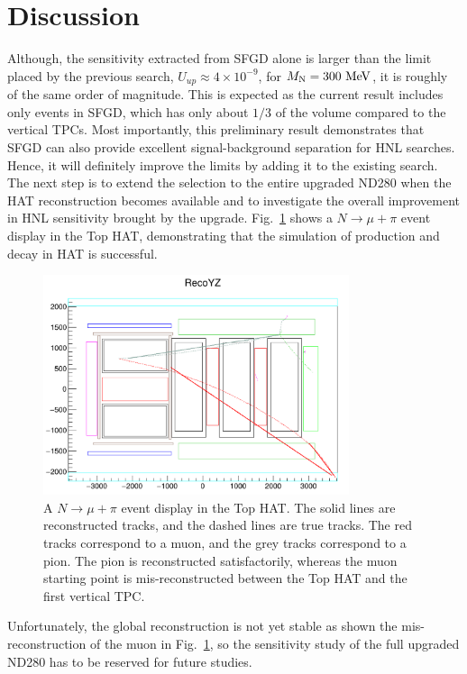     \section{Discussion}
        Although, the sensitivity extracted from SFGD alone is larger than the limit placed by the previous search, $U_{up}\approx4\times10^{-9}$, for $M_{\textrm{N}}=300~\textrm{MeV}$, it is roughly of the same order of magnitude. 
        This is expected as the current result includes only events in SFGD, which has only about $1/3$ of the volume compared to the vertical TPCs. 
        Most importantly, this preliminary result demonstrates that SFGD can also provide excellent signal-background separation for HNL searches.
        Hence, it will definitely improve the limits by adding it to the existing search. 
        The next step is to extend the selection to the entire upgraded ND280 when the HAT reconstruction becomes available and to investigate the overall improvement in HNL sensitivity brought by the upgrade.
        Fig.~\ref{fig:hnl-hatevedis} shows a $N\rightarrow\mu+\pi$ event display in the Top HAT, demonstrating that the simulation of production and decay in HAT is successful. 
        \begin{figure}[!htb] 
            \centering 		
            \includegraphics[width=0.8\textwidth]{figures/hnl/HATevedis.png}
            \caption{\label{fig:hnl-hatevedis} A $N\rightarrow\mu+\pi$ event display in the Top HAT.
            The solid lines are reconstructed tracks, and the dashed lines are true tracks.
            The red tracks correspond to a muon, and the grey tracks correspond to a pion.
            The pion is reconstructed satisfactorily, whereas the muon starting point is mis-reconstructed between the Top HAT and the first vertical TPC.
            }
        \end{figure}
        Unfortunately, the global reconstruction is not yet stable as shown the mis-reconstruction of the muon in Fig.~\ref{fig:hnl-hatevedis}, so the sensitivity study of the full upgraded ND280 has to be reserved for future studies.